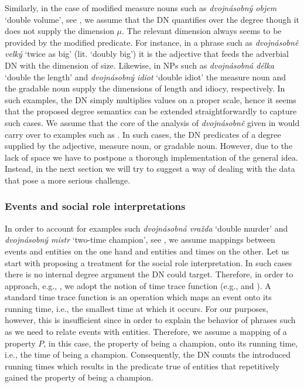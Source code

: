 \documentclass[output=paper,modfonts,hidelinks,newtxmath
\ChapterDOI{10.5281/zenodo.2545513}
]{langscibook}
\begin{document}
\noindent Similarly, in the case of modified measure nouns such as \textit{dvojnásobný objem} `double volume', see , we assume that the DN quantifies over the degree though it does not supply the dimension $\mu$. The relevant dimension always seems to be provided by the modified predicate. For instance, in a phrase such as \textit{dvojnásobně velký} `twice as big' (lit. `doubly big') it is the adjective that feeds the adverbial DN with the dimension of size. Likewise, in NPs such as \textit{dvojnásobná délka} `double the length' and \textit{dvojnásobný idiot} `double idiot' the measure noun and the gradable noun supply the dimensions of length and idiocy, respectively. In such examples, the DN simply multiplies values on a proper scale, hence it seems that the proposed degree semantics can be extended straightforwardly to capture such cases. We assume that the core of the analysis of \textit{dvojnásobně} given in  would carry over to examples such as . In such cases, the DN predicates of a degree supplied by the adjective, measure noun, or gradable noun. However, due to the lack of space we have to postpone a thorough implementation of the general idea. Instead, in the next section we will try to suggest a way of dealing with the data that pose a more serious challenge.

\subsubsection{Events and social role interpretations}\label{events-and-social-role-interpretations}

In order to account for examples such \textit{dvojnásobná vražda} `double murder' and \textit{dvojnásobný mistr} `two-time champion', see , we assume mappings between events and entities on the one hand and entities and times on the other. Let us start with proposing a treatment for the social role interpretation. In such cases there is no internal degree argument the DN could target. Therefore, in order to approach, e.g., , we adopt the notion of time trace function (e.g., \citealt{krifka_nominal_1989} and \citealt{lasersohn_plurality_1995}). A standard time trace function is an operation which maps an event onto its running time, i.e., the smallest time at which it occurs. For our purposes, however, this is insufficient since in order to explain the behavior of phrases such as  we need to relate events with entities. Therefore, we assume a mapping of a property $P$, in this case, the property of being a champion, onto its running time, i.e., the time of being a champion. Consequently, the DN counts the introduced running times which results in the predicate true of entities that repetitively gained the property of being a champion.
\end{document}
